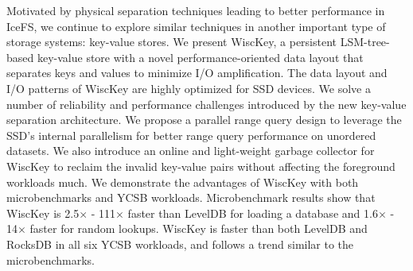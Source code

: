 Motivated by physical separation techniques leading to better
performance in IceFS, we continue to explore similar techniques in
another important type of storage systems: key-value stores. 
We present WiscKey, a persistent LSM-tree-based key-value 
store with a novel performance-oriented data layout that separates
keys and values to minimize I/O amplification. The data layout and I/O
patterns of WiscKey are highly optimized for SSD devices. 
We solve a number of reliability and performance challenges
introduced by the new key-value separation architecture. We propose a
parallel range query design to leverage the SSD's internal parallelism
for better range query performance on unordered datasets. We also
introduce an online and light-weight garbage collector for WiscKey to
reclaim the invalid key-value pairs without affecting the foreground
workloads much. We demonstrate the advantages of WiscKey with both
microbenchmarks and YCSB workloads. Microbenchmark results show that
WiscKey is 2.5$\times$ - 111$\times$ faster than LevelDB for loading a
database and 1.6$\times$ - 14$\times$ faster for random lookups.
WiscKey is faster than both LevelDB and RocksDB in all six YCSB
workloads, and follows a trend similar to the microbenchmarks. 

